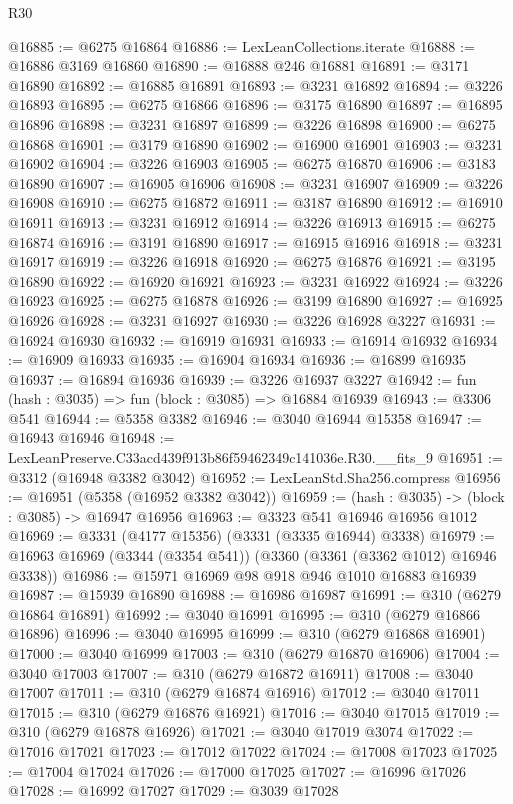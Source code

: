 \begin{lexlean}{R30}
\begin{coremodule}
@16885 := @6275 @16864
@16886 := LexLeanCollections.iterate
@16888 := @16886 @3169 @16860
@16890 := @16888 @246 @16881
@16891 := @3171 @16890
@16892 := @16885 @16891
@16893 := @3231 @16892
@16894 := @3226 @16893
@16895 := @6275 @16866
@16896 := @3175 @16890
@16897 := @16895 @16896
@16898 := @3231 @16897
@16899 := @3226 @16898
@16900 := @6275 @16868
@16901 := @3179 @16890
@16902 := @16900 @16901
@16903 := @3231 @16902
@16904 := @3226 @16903
@16905 := @6275 @16870
@16906 := @3183 @16890
@16907 := @16905 @16906
@16908 := @3231 @16907
@16909 := @3226 @16908
@16910 := @6275 @16872
@16911 := @3187 @16890
@16912 := @16910 @16911
@16913 := @3231 @16912
@16914 := @3226 @16913
@16915 := @6275 @16874
@16916 := @3191 @16890
@16917 := @16915 @16916
@16918 := @3231 @16917
@16919 := @3226 @16918
@16920 := @6275 @16876
@16921 := @3195 @16890
@16922 := @16920 @16921
@16923 := @3231 @16922
@16924 := @3226 @16923
@16925 := @6275 @16878
@16926 := @3199 @16890
@16927 := @16925 @16926
@16928 := @3231 @16927
@16930 := @3226 @16928 @3227
@16931 := @16924 @16930
@16932 := @16919 @16931
@16933 := @16914 @16932
@16934 := @16909 @16933
@16935 := @16904 @16934
@16936 := @16899 @16935
@16937 := @16894 @16936
@16939 := @3226 @16937 @3227
@16942 := fun (hash : @3035) => fun (block : @3085) => @16884 @16939
@16943 := @3306 @541
@16944 := @5358 @3382
@16946 := @3040 @16944 @15358
@16947 := @16943 @16946
@16948 := LexLeanPreserve.C33acd439f913b86f59462349c141036e.R30.__fits_9
@16951 := @3312 (@16948 @3382 @3042)
@16952 := LexLeanStd.Sha256.compress
@16956 := @16951 (@5358 (@16952 @3382 @3042))
@16959 := (hash : @3035) -> (block : @3085) -> @16947 @16956
@16963 := @3323 @541 @16946 @16956 @1012
@16969 := @3331 (@4177 @15356) (@3331 (@3335 @16944) @3338)
@16979 := @16963 @16969 (@3344 (@3354 @541)) (@3360 (@3361 (@3362 @1012) @16946 @3338))
@16986 := @15971 @16969 @98 @918 @946 @1010 @16883 @16939
@16987 := @15939 @16890
@16988 := @16986 @16987
@16991 := @310 (@6279 @16864 @16891)
@16992 := @3040 @16991
@16995 := @310 (@6279 @16866 @16896)
@16996 := @3040 @16995
@16999 := @310 (@6279 @16868 @16901)
@17000 := @3040 @16999
@17003 := @310 (@6279 @16870 @16906)
@17004 := @3040 @17003
@17007 := @310 (@6279 @16872 @16911)
@17008 := @3040 @17007
@17011 := @310 (@6279 @16874 @16916)
@17012 := @3040 @17011
@17015 := @310 (@6279 @16876 @16921)
@17016 := @3040 @17015
@17019 := @310 (@6279 @16878 @16926)
@17021 := @3040 @17019 @3074
@17022 := @17016 @17021
@17023 := @17012 @17022
@17024 := @17008 @17023
@17025 := @17004 @17024
@17026 := @17000 @17025
@17027 := @16996 @17026
@17028 := @16992 @17027
@17029 := @3039 @17028

\end{coremodule}
\end{lexlean}
